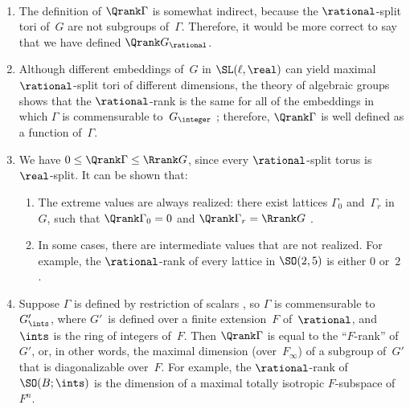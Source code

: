 \begin{rems} \label{QrankRems} \ 
\noprelistbreak
	\begin{enumerate}

	\item The definition of $\Qrank \Gamma$ is somewhat indirect,
because the $\rational$-split tori of~$G$ are not subgroups
of~$\Gamma$. Therefore, it would be more correct to say that
we have defined $\Qrank G_{\rational} $. 

	\item Although different embeddings
of~$G$ in $\SL(\ell,\real)$ can yield maximal $\rational$-split tori of different dimensions, the theory of algebraic groups shows
that the $\rational$-rank is the same for all of the embeddings in
which $\Gamma$ is commensurable to~$G_{\integer}$
; therefore, $\Qrank \Gamma$ is well defined
as a function of~$\Gamma$.

	\item We have $0 \le \Qrank \Gamma \le \Rrank G$, since every $\rational$-split torus is $\real$-split. It can be shown that:
		\begin{enumerate}
	
		\item The extreme values are always realized: there exist lattices $\Gamma_0$ and~$\Gamma_r$ in~$G$, such that $\Qrank \Gamma_0 = 0$ and $\Qrank \Gamma_r = \Rrank G$ .
		
		\item \label{QrankRems-gap} 
		In some cases, there are intermediate values 
		that are not realized. For example, the $\rational$-rank of every lattice in $\SO(2,5)$ is either $0$ or~$2$ .
		\end{enumerate}
	
	\item Suppose $\Gamma$ is defined by restriction of scalars , so $\Gamma$ is commensurable to $G'_{\ints}$, where $G'$~is defined over a finite extension~$F$ of~$\rational$, and $\ints$ is the ring of integers of~$F$. Then $\Qrank \Gamma$ is equal to the ``$F$-rank'' of~$G'$, or, in other words, the maximal dimension (over~$F_\infty$) of a subgroup of~$G'$ that is diagonalizable over~$F$. For example, the $\rational$-rank of  $\SO(B; \ints)$ is the dimension of a maximal totally isotropic $F$-subspace of~$F^n$.

	\end{enumerate}
 \end{rems}


